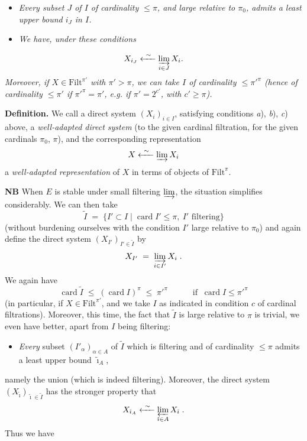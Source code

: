 \documentclass[11pt]{article}
\newcommand{\printedpage}[1]{\marginpar{\footnotesize p.~#1}}
\newcommand{\msp}[1]{\marginpar{\footnotesize [#1]}}
\newcommand{\card}{\operatorname{card}}
\newcommand{\Filt}{\mathrm{Filt}}
\begin{document}
\begin{itemize}
\item[b)] \textit{Every subset $J$ of $I$ of cardinality $\le\pi$, and large relative to $\pi_0$, admits a least upper bound $i_J$ in $I$.}
\item[c)] \textit{We have, under these conditions}
\end{itemize}

\printedpage{46}
\msp{page 84}
\[
X_{i_J} \xleftarrow{\ \sim\ } \varinjlim_{i\in J} X_i .
\]
\textit{Moreover, if $X\in\Filt^{\pi'}$ with $\pi'>\pi$, we can take $I$ of cardinality $\le\pi'^{\pi}$ (hence of cardinality $\le\pi'$ if $\pi'^{\pi}=\pi'$, e.g. if $\pi'=2^{c'}$, with $c'\ge\pi$).}

\textbf{Definition.} We call a direct system $(X_i)_{i\in I}$, satisfying conditions \textit{a}), \textit{b}), \textit{c}) above, a \textit{well-adapted direct system} (to the given cardinal filtration, for the given cardinals $\pi_0$, $\pi$), and the corresponding representation
\[
X \xleftarrow{\ \sim\ } \varinjlim X_i
\]
a \textit{well-adapted representation} of $X$ in terms of objects of $\Filt^\pi$.

\textbf{NB} When $E$ is stable under small filtering $\varinjlim$, the situation simplifies considerably. We can then take
\[
\tilde I \;=\; \{I'\subset I \mid \card I'\le\pi,\ I' \text{ filtering}\}
\]
(without burdening ourselves with the condition $I'$ large relative to $\pi_0$) and again define the direct system $(X_{I'})_{I'\in\tilde I}$ by
\[
X_{I'} \;=\; \varinjlim_{i\in I'} X_i \;.
\]
We again have
\msp{page 85}
\[
\card\tilde I \;\le\; (\card I)^\pi \;\le\; \pi'^{\pi} \qquad\quad \text{if }\ \card I\le\pi'^{\pi}
\]
(in particular, if $X\in\Filt^{\pi'}$, and we take $I$ as indicated in condition $c$ of cardinal filtrations). Moreover, this time, the fact that $\tilde I$ is large relative to $\pi$ is trivial, we even have better, apart from $I$ being filtering:

\begin{itemize}
\item[$(*)$] \textit{Every} subset $(I'_\alpha)_{\alpha\in A}$ of $\tilde I$ which is filtering and of cardinality $\le\pi$ admits a least upper bound $\tilde\imath_A$,
\end{itemize}

namely the union (which is indeed filtering). Moreover, the direct system $(X_{\tilde\imath})_{\tilde\imath\in\tilde I}$ has the stronger property that
\[
X_{\tilde\imath_A} \xleftarrow{\ \sim\ } \varprojlim_{\tilde\imath\in A} X_{\tilde\imath} \;. %
\]
Thus we have
\end{document}
